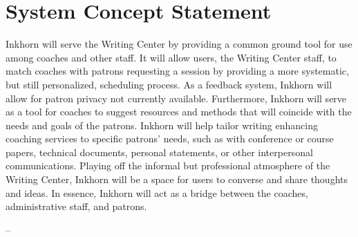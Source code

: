 \documentclass[12pt]{article} %
\begin{document}
\newpage
\section{System Concept Statement} %


Inkhorn will serve the Writing Center by providing a common ground tool for use among coaches and other staff.
It will allow users, the Writing Center staff, to match coaches with patrons requesting a session by providing a more systematic, but still personalized, scheduling process.
As a feedback system, Inkhorn will allow for patron privacy not currently available.
Furthermore, Inkhorn will serve as a tool for coaches to suggest resources and methods that will coincide with the needs and goals of the patrons.
Inkhorn will help tailor writing enhancing coaching services to specific patrons’ needs, such as with conference or course papers, technical documents, personal statements, or other interpersonal communications.
Playing off the informal but professional atmosphere of the Writing Center, Inkhorn will be a space for users to converse and share thoughts and ideas.
In essence, Inkhorn will act as a bridge between the coaches, administrative staff, and patrons.

--
\end{document}
